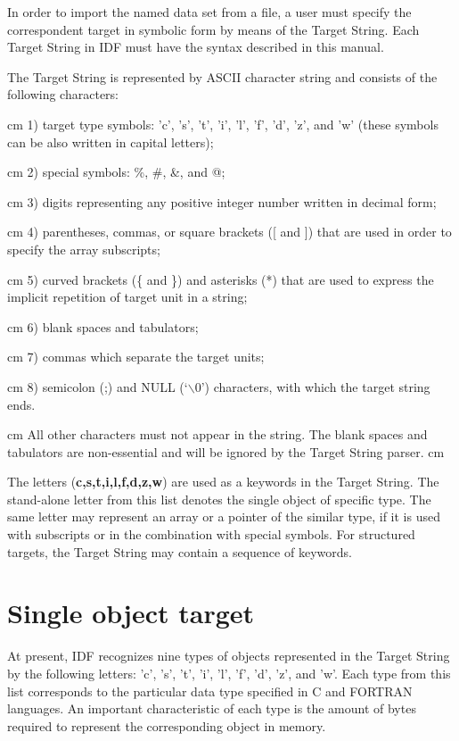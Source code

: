 In order to import the named data set from a file, a user
must specify the correspondent target in symbolic form
by means of the Target String.
Each Target String in IDF must have the syntax
described in this manual.

The Target String is represented by ASCII character string
and consists of the following characters:

{
{ cm}
1) target type symbols: 'c', 's', 't', 'i', 'l', 'f',
'd', 'z', and 'w' (these symbols can be also written
in capital letters);
}

{
{ cm}
2) special symbols: \%, \#, \&, and @;
}

{
{ cm}
3) digits representing any positive integer number
written in decimal form;
}

{
{ cm}
4) parentheses, commas, or square brackets ([ and ])
that are used in order to specify the array subscripts;
}

{
{ cm}
5) curved brackets (\{ and \}) and asterisks (*) 
that are used to express the implicit repetition 
of target unit in a string;
}

{
{ cm}
6) blank spaces and tabulators;
}

{
{ cm}
7) commas which separate the target units;
}

{
{ cm}
8) semicolon (;) and NULL (`$\backslash$0') characters,
with which the target string ends.
}

{
{ cm}
All other characters must not appear in the string.
The blank spaces and tabulators are non-essential and will be ignored
by the Target String parser.
}
 cm

The letters ({\bf c,s,t,i,l,f,d,z,w}) are used as a keywords
in the Target String. The stand-alone letter from this list
denotes the single object of specific type. The same letter
may represent an array or a pointer of the similar type,
if it is used  with subscripts or in the combination with
special symbols. 
For structured targets, the Target String may contain
a sequence of keywords. 

\section*{Single object target}

At present, IDF recognizes nine types of objects represented
in the Target String
by the following letters: 'c', 's', 't', 'i', 'l', 'f',
'd', 'z', and 'w'. Each type from this list corresponds to the
particular data type specified in C and FORTRAN languages.
An important characteristic of each type is the amount of
bytes required to represent the corresponding object in memory. 

